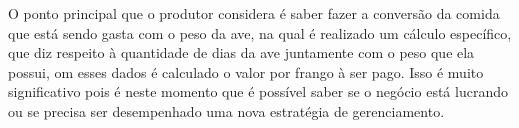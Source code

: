O ponto principal que o produtor considera é saber fazer a conversão da comida que está sendo gasta com o peso da ave, na qual é realizado um cálculo específico, que diz respeito à quantidade de dias da ave juntamente com o peso que ela possui, om esses dados é calculado o valor por frango à ser pago. Isso é muito significativo pois é neste momento que é possível saber se o negócio está lucrando ou se precisa ser desempenhado uma nova estratégia de gerenciamento.





